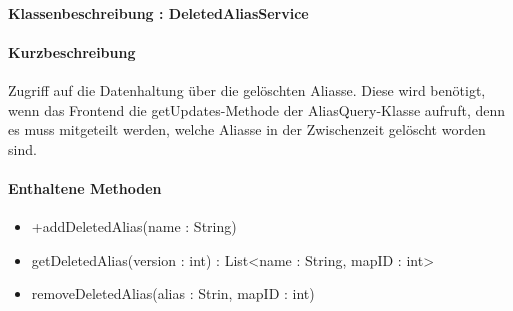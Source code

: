 \paragraph{Klassenbeschreibung : DeletedAliasService}%
\paragraph*{Kurzbeschreibung}
Zugriff auf die Datenhaltung über die gelöschten Aliasse. Diese wird benötigt, wenn das Frontend die getUpdates-Methode der AliasQuery-Klasse aufruft, 
denn es muss mitgeteilt werden, welche Aliasse in der Zwischenzeit gelöscht worden sind.

\paragraph*{Enthaltene Methoden}
\begin{itemize}
    \item +addDeletedAlias(name : String)
    \item getDeletedAlias(version : int) : List<name : String, mapID : int>
    \item removeDeletedAlias(alias : Strin, mapID : int)
\end{itemize}